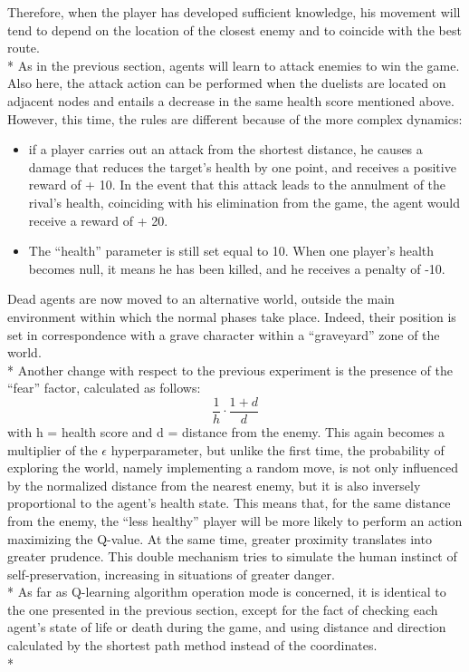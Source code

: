 Therefore, when the player has developed sufficient knowledge, his movement will tend to depend on the location of the closest enemy and to coincide with the best route.\\*
As in the previous section, agents will learn to attack enemies to win the game. Also here, the attack action can be performed when the duelists are located on adjacent nodes and entails a decrease in the same health score mentioned above. However, this time, the rules are different because of the more complex dynamics:
\begin{itemize}[noitemsep, topsep=0ex]
  \item if a player carries out an attack from the shortest distance, he causes a damage that reduces the target's health by one point, and receives a positive reward of + 10. In the event that this attack leads to the annulment of the rival's health, coinciding with his elimination from the game, the agent would receive a reward of + 20.
  \item The ``health'' parameter is still set equal to 10. When one player's health becomes null, it means he has been killed, and he receives a penalty of -10.
\end{itemize}
Dead agents are now moved to an alternative world, outside the main environment within which the normal phases take place. Indeed, their position is set in correspondence with a grave character within a ``graveyard'' zone of the world.\\*
Another change with respect to the previous experiment is the presence of the ``fear'' factor, calculated as follows:
$$\frac{1}{h}\cdot\frac{1+d}{d}$$
with h = health score and d = distance from the enemy.
This again becomes a multiplier of the $\epsilon$ hyperparameter, but unlike the first time, the probability of exploring the world, namely implementing a random move, is not only influenced by the normalized distance from the nearest enemy, but it is also inversely proportional to the agent's health state. This means that, for the same distance from the enemy, the ``less healthy'' player will be more likely to perform an action maximizing the Q-value. At the same time, greater 	proximity translates into greater prudence. This double mechanism tries to simulate the human instinct of self-preservation, increasing in situations of greater danger.\\*
As far as Q-learning algorithm operation mode is concerned, it is identical to the one presented in the previous section, except for the fact of checking each agent's state of life or death during the game, and using distance and direction calculated by the shortest path method instead of the coordinates.\\*
